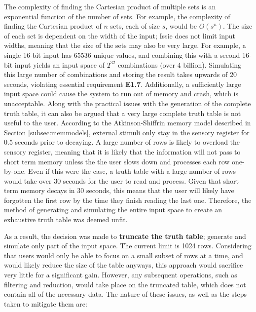 The complexity of finding the Cartesian product of multiple sets is an exponential function of the number of sets. For example, the complexity of finding the Cartesian product of $n$ sets, each of size $s$, would be $O(s^n)$. The size of each set is dependent on the width of the input; Issie does not limit input widths, meaning that the size of the sets may also be very large. For example, a single 16-bit input has 65536 unique values, and combining this with a second 16-bit input yields an input space of $2^{32}$ combinations (over 4 billion). Simulating this large number of combinations and storing the result takes upwards of 20 seconds, violating essential requirement \textbf{E1.7}. Additionally, a sufficiently large input space could cause the system to run out of memory and crash, which is unacceptable. Along with the practical issues with the generation of the complete truth table, it can also be argued that a very large complete truth table is not useful to the user. According to the Atkinson-Shiffrin memory model described in Section \ref{subsec:memmodels}, external stimuli only stay in the sensory register for 0.5 seconds prior to decaying. A large number of rows is likely to overload the sensory register, meaning that it is likely that the information will not pass to short term memory unless the the user slows down and processes each row one-by-one. Even if this were the case, a truth table with a large number of rows would take over 30 seconds for the user to read and process. Given that short term memory decays in 30 seconds, this means that the user will likely have forgotten the first row by the time they finish reading the last one. Therefore, the method of generating and simulating the entire input space to create an exhaustive truth table was deemed unfit.

As a result, the decision was made to \textbf{truncate the truth table}; generate and simulate only part of the input space. The current limit is 1024 rows. Considering that users would only be able to focus on a small subset of rows at a time, and would likely reduce the size of the table anyways, this approach would sacrifice very little for a significant gain. However, any subsequent operations, such as filtering and reduction, would take place on the truncated table, which does not contain all of the necessary data. The nature of these issues, as well as the steps taken to mitigate them are:

